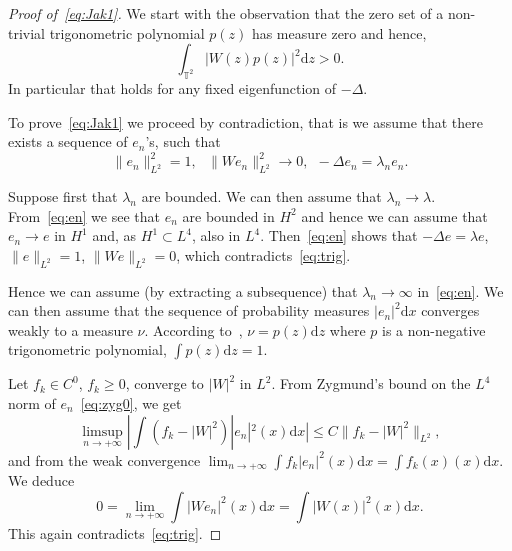 \documentclass[AHL, Unicode, longabstracts]{cedram}
\newcommand{\TT}{{\mathbb T}}
\newcommand{\TT}{{\mathbb T}}
\newcommand*{\dd}{\mathrm{d}}
\newcommand*{\dx}{\dd x}
\newcommand*{\dz}{\dd z}
\begin{document}
\begin{proof}[Proof of~\eqref{eq:Jak1}]
We start with the observation that the zero set of a non-trivial trigonometric polynomial $ p (z) $ has measure zero and hence,
\begin{equation}\label{eq:trig}
\int_{\TT^2} | W (z) p(z) |^2 \dz > 0.
\end{equation}
In particular that holds for any fixed eigenfunction of $ - \Delta $.

To prove~\eqref{eq:Jak1} we proceed by contradiction, that is we assume that there exists a sequence of $ e_n $'s, such that
\begin{equation}\label{eq:en}
\|e_n \|_{L^2}^2 = 1, \ \ \ \| W e_n \|_{L^2}^2 \rightarrow 0, \ \ - \Delta e_n =
\lambda_n e_n.
\end{equation}

Suppose first that $ \lambda_n $ are bounded. We can then assume that $ \lambda_n \to \lambda $. From~\eqref{eq:en} we see that $ e_n $ are bounded in $ H^2 $ and hence we can assume that $ e_n \to e $ in $ H^1 $ and, as $ H^1 \subset L^4 $, also in $ L^4 $. Then~\eqref{eq:en} shows that $ -\Delta e = \lambda e$, $ \| e\|_{L^2 } = 1 $, $ \| W e \|_{L^2 } = 0$, which contradicts~\eqref{eq:trig}.

Hence we can assume (by extracting a subsequence) that $ \lambda_n \to \infty $ in~\eqref{eq:en}. We can then assume that the sequence of probability measures $ |e_n|^2 \dx $ converges weakly to a measure $\nu$. According to~\cite[Theorem~1.2]{Jak}, $ \nu = p (z) \dz $ where $ p$ is a non-negative trigonometric polynomial, $ \int p (z) \dz = 1 $.

Let $ f_k\in C^0$, $ f_k \geq 0$, converge to $|W|^2 $ in $L^2$. From Zygmund's bound on the $L^4$ norm of $e_n$~\eqref{eq:zyg0}, we get
\[
\limsup_{n\rightarrow + \infty} | \int (f_k - |W |^2)|e_n|^2 (x) \dx | \leq C \| f_k - |W|^2\|_{L^2},
\]
and from the weak convergence $ \lim_{n\rightarrow + \infty} \int f_k|e_n|^2 (x) \dx = \int f_k (x) (x)\dx.$ We deduce
\[
0= \lim_{n\rightarrow + \infty} \int |W e_n|^2 (x) \dx = \int |W (x)|^2 (x)\dx.
\]
This again contradicts~\eqref{eq:trig}.
\end{proof}


\end{document}
